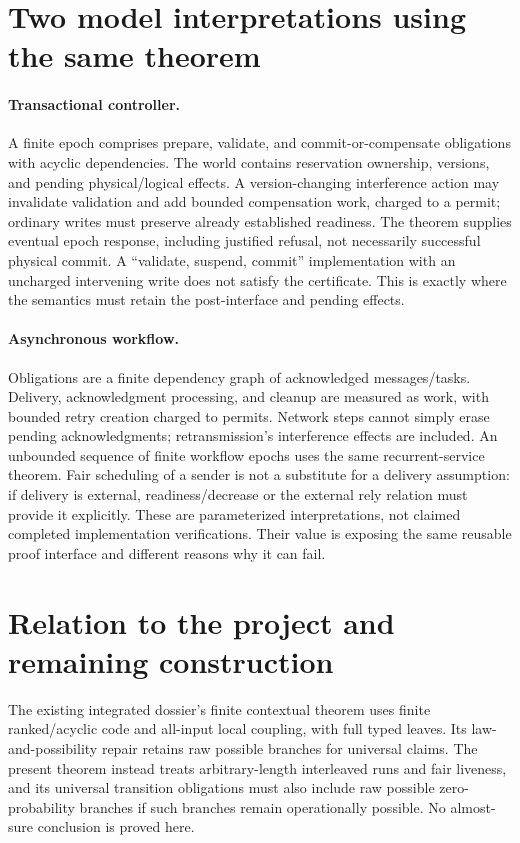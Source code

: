 \documentclass[11pt]{article}
\begin{document}
\section{Two model interpretations using the same theorem}
\paragraph{Transactional controller.} A finite epoch comprises prepare, validate, and commit-or-compensate obligations with acyclic dependencies. The world contains reservation ownership, versions, and pending physical/logical effects. A version-changing interference action may invalidate validation and add bounded compensation work, charged to a permit; ordinary writes must preserve already established readiness. The theorem supplies eventual epoch response, including justified refusal, not necessarily successful physical commit. A ``validate, suspend, commit'' implementation with an uncharged intervening write does not satisfy the certificate. This is exactly where the semantics must retain the post-interface and pending effects.
\paragraph{Asynchronous workflow.} Obligations are a finite dependency graph of acknowledged messages/tasks. Delivery, acknowledgment processing, and cleanup are measured as work, with bounded retry creation charged to permits. Network steps cannot simply erase pending acknowledgments; retransmission's interference effects are included. An unbounded sequence of finite workflow epochs uses the same recurrent-service theorem. Fair scheduling of a sender is not a substitute for a delivery assumption: if delivery is external, readiness/decrease or the external rely relation must provide it explicitly.
These are parameterized interpretations, not claimed completed implementation verifications. Their value is exposing the same reusable proof interface and different reasons why it can fail.

\section{Relation to the project and remaining construction}
The existing integrated dossier's finite contextual theorem uses finite ranked/acyclic code and all-input local coupling, with full typed leaves. Its law-and-possibility repair retains raw possible branches for universal claims. The present theorem instead treats arbitrary-length interleaved runs and fair liveness, and its universal transition obligations must also include raw possible zero-probability branches if such branches remain operationally possible. No almost-sure conclusion is proved here.
\end{document}
